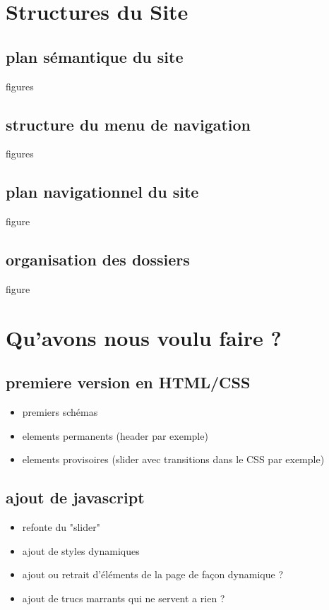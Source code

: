 \documentclass{scrartcl}
\begin{document}
\section{Structures du Site}
\subsection{plan sémantique du site}
figures
\subsection{structure du menu de navigation}
figures
\subsection{ plan  navigationnel du site}
figure
\subsection{organisation des dossiers}
figure

\section{Qu'avons nous voulu faire ?}
\subsection{premiere version en HTML/CSS}
\begin{itemize}
\item premiers schémas
\item elements permanents (header par exemple)
\item elements provisoires (slider avec transitions dans le CSS par exemple)
\end{itemize}


\subsection{ajout de javascript}
\begin{itemize}
\item refonte du "slider"
\item ajout de styles dynamiques
\item ajout ou retrait d'éléments de la page de façon dynamique ?
\item ajout de trucs marrants qui ne servent a rien ?
\end{itemize}
\end{document}

